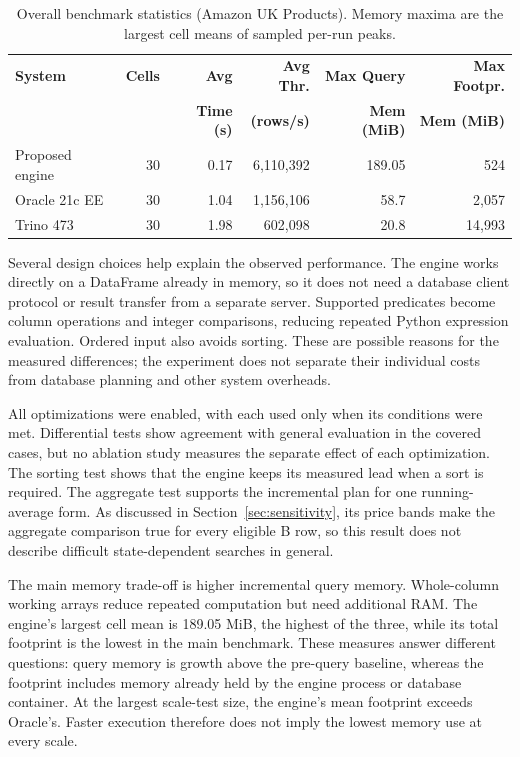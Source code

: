 \documentclass[preprint,12pt,times,a4paper]{elsarticle}
\begin{document}
\begin{table}[H]
\centering\footnotesize
\setlength{\tabcolsep}{3pt}

\begin{tabular}{lrrrrr}
\toprule
\textbf{System} & \textbf{Cells} & \textbf{Avg} & \textbf{Avg Thr.} & \textbf{Max Query} & \textbf{Max Footpr.} \\
 & & \textbf{Time (s)} & \textbf{(rows/s)} & \textbf{Mem (MiB)} & \textbf{Mem (MiB)} \\
\midrule
Proposed engine & 30 & 0.17 & 6,110,392 & 189.05 & 524 \\
Oracle 21c EE & 30 & 1.04 & 1,156,106 & 58.7 & 2,057 \\
Trino 473 & 30 & 1.98 & 602,098 & 20.8 & 14,993 \\
\bottomrule
\end{tabular}
\caption{Overall benchmark statistics (Amazon UK Products). Memory maxima
are the largest cell means of sampled per-run peaks.}
\label{tab:overall_stats}
\end{table}

Several design choices help explain the observed performance. The engine
works directly on a DataFrame already in memory, so it does not need a
database client protocol or result transfer from a separate server. Supported
predicates become column operations and integer comparisons, reducing
repeated Python expression evaluation. Ordered input also avoids sorting.
These are possible reasons for the measured differences; the experiment
does not separate their individual costs from database planning and other
system overheads.

All optimizations were enabled, with each used only when its conditions were
met. Differential tests show agreement with general evaluation in the covered
cases, but no ablation study measures the separate effect of each optimization.
The sorting test shows that the engine keeps its measured lead when a sort is
required. The aggregate test supports the incremental plan for one running-average
form. As discussed in Section~\ref{sec:sensitivity}, its price bands make
the aggregate comparison true for every eligible B row, so this result does
not describe difficult state-dependent searches in general.

The main memory trade-off is higher incremental query memory. Whole-column
working arrays reduce repeated computation but need additional RAM. The engine's
largest cell mean is 189.05 MiB, the highest of the three, while its total
footprint is the lowest in the main benchmark. These measures answer
different questions: query memory is growth above the pre-query baseline,
whereas the footprint includes memory already held by the engine process or
database container. At the largest scale-test size, the engine's mean
footprint exceeds Oracle's. Faster execution therefore does not imply the
lowest memory use at every scale.
\end{document}
